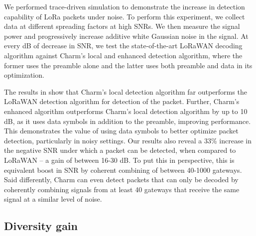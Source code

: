 We performed trace-driven simulation to demonstrate the increase in detection capability of LoRa packets under noise. To perform this experiment, we collect data at different spreading factors at high SNRs. We then measure the signal power and progressively increase additive white Gaussian noise in the signal. At every dB of decrease in SNR, we test the state-of-the-art LoRaWAN decoding algorithm against Charm's local and enhanced detection algorithm, where the former uses the preamble alone and the latter uses both preamble and data in its optimization. 

The results in  show that Charm's local detection algorithm far outperforms the LoRaWAN detection algorithm for detection of the packet. Further, Charm's enhanced algorithm outperforms Charm's local detection algorithm by up to 10 dB, as it uses data symbols in addition to the preamble, improving performance. This demonstrates the value of using data symbols to better optimize packet detection, particularly in noisy settings. Our results also reveal a 33\% increase in the negative SNR under which a packet can be detected, when compared to LoRaWAN -- a gain of between 16-30 dB. To put this in perspective, this is equivalent boost in SNR by coherent combining of between 40-1000 gateways. Said differently, Charm can even detect packets that can only be decoded by coherently combining signals from at least 40 gateways that receive the same signal at a similar level of noise. 

\subsection{Diversity gain}
\label{sec:diversity-gain-eval}


